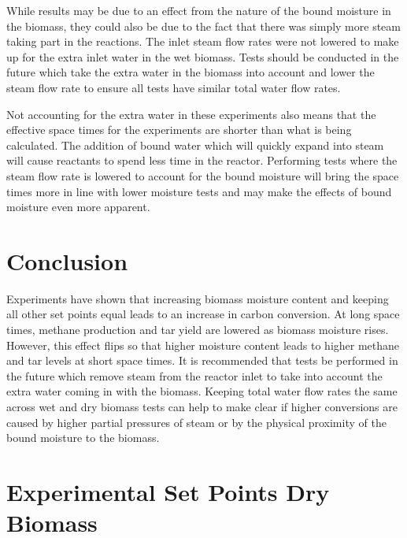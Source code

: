 \documentclass[11pt,twocolumn]{article}
\begin{document}
While results may be due to an effect from the nature of the bound moisture in the biomass, they could also be due to the fact that there was simply more steam taking part in the reactions.  The inlet steam flow rates were not lowered to make up for the extra inlet water in the wet biomass.  Tests should be conducted in the future which take the extra water in the biomass into account and lower the steam flow rate to ensure all tests have similar total water flow rates.

Not accounting for the extra water in these experiments also means that the effective space times for the experiments are shorter than what is being calculated.  The addition of bound water which will quickly expand into steam will cause reactants to spend less time in the reactor.  Performing tests where the steam flow rate is lowered to account for the bound moisture will bring the space times more in line with lower moisture tests and may make the effects of bound moisture even more apparent.  

\section*{Conclusion}

Experiments have shown that increasing biomass moisture content and keeping all other set points equal leads to an increase in carbon conversion.  At long space times, methane production and tar yield are lowered as biomass moisture rises.  However, this effect flips so that higher moisture content leads to higher methane and tar levels at short space times.  It is recommended that tests be performed in the future which remove steam from the reactor inlet to take into account the extra water coming in with the biomass.  Keeping total water flow rates the same across wet and dry biomass tests can help to make clear if higher conversions are caused by higher partial pressures of steam or by the physical proximity of the bound moisture to the biomass.   

\balance

\newpage
\appendix
\onecolumn

\section{Experimental Set Points Dry Biomass}
\label{app_dry_sp}
\end{document}

